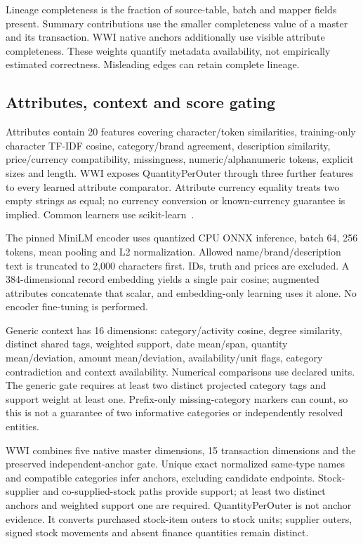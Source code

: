 \documentclass[conference,letterpaper]{IEEEtran}
\begin{document}
Lineage completeness is the fraction of source-table, batch and mapper fields present. Summary contributions use the smaller completeness value of a master and its transaction. WWI native anchors additionally use visible attribute completeness. These weights quantify metadata availability, not empirically estimated correctness. Misleading edges can retain complete lineage.

\subsection{Attributes, context and score gating}
Attributes contain 20 features covering character/token similarities, training-only character TF-IDF cosine, category/brand agreement, description similarity, price/currency compatibility, missingness, numeric/alphanumeric tokens, explicit sizes and length. WWI exposes QuantityPerOuter through three further features to every learned attribute comparator. Attribute currency equality treats two empty strings as equal; no currency conversion or known-currency guarantee is implied. Common learners use scikit-learn~\cite{sklearn}.

The pinned MiniLM encoder uses quantized CPU ONNX inference, batch 64, 256 tokens, mean pooling and L2 normalization. Allowed name/brand/description text is truncated to 2,000 characters first. IDs, truth and prices are excluded. A 384-dimensional record embedding yields a single pair cosine; augmented attributes concatenate that scalar, and embedding-only learning uses it alone. No encoder fine-tuning is performed.

Generic context has 16 dimensions: category/activity cosine, degree similarity, distinct shared tags, weighted support, date mean/span, quantity mean/deviation, amount mean/deviation, availability/unit flags, category contradiction and context availability. Numerical comparisons use declared units. The generic gate requires at least two distinct projected category tags and support weight at least one. Prefix-only missing-category markers can count, so this is not a guarantee of two informative categories or independently resolved entities.

WWI combines five native master dimensions, 15 transaction dimensions and the preserved independent-anchor gate. Unique exact normalized same-type names and compatible categories infer anchors, excluding candidate endpoints. Stock-supplier and co-supplied-stock paths provide support; at least two distinct anchors and weighted support one are required. QuantityPerOuter is not anchor evidence. It converts purchased stock-item outers to stock units; supplier outers, signed stock movements and absent finance quantities remain distinct.
\end{document}
